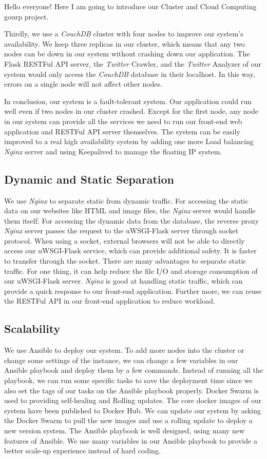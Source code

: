 \documentclass{article}
\begin{document}
Hello everyone! Here I am going to introduce our Cluster and Cloud Computing gourp project.
 

Thirdly, we use a \textit{CouchDB} cluster with four nodes to improve our system's availability. We keep three replicas in our cluster, which means that any two nodes can be down in our system without crashing down our application. The Flask RESTFul API server, the \textit{Twitter} Crawler, and the \textit{Twitter} Analyzer of our system would only access the \textit{CouchDB} database in their localhost. In this way, errors on a single node will not affect other nodes. 

In conclusion, our system is a fault-tolerant system. Our application could run well even if two nodes in our cluster crashed. Except for the first node, any node in our system can provide all the services we need to run our front-end web application and RESTFul API server themselves. The system can be easily improved to a real high availability system by adding one more Load balancing \textit{Nginx} server and using Keepalived to manage the floating IP system.

\subsection{Dynamic and Static Separation}
We use \textit{Nginx} to separate static from dynamic traffic. For accessing the static data on our websites like HTML and image files, the \textit{Nginx} server would handle them itself. For accessing the dynamic data from the database, the reverse proxy \textit{Nginx} server passes the request to the uWSGI-Flask server through socket protocol. When using a socket, external browsers will not be able to directly access our uWSGI-Flask service, which can provide additional safety. It is faster to transfer through the socket. There are many advantages to separate static traffic. For one thing, it can help reduce the file I/O and storage consumption of our uWSGI-Flask server. \textit{Nginx} is good at handling static traffic, which can provide a quick response to our front-end application. Further more, we can reuse the RESTFul API in our front-end application to reduce workload.

\subsection{Scalability}
We use Ansible to deploy our system. To add more nodes into the cluster or change some settings of the instance, we can change a few variables in our Ansible playbook and deploy them by a few commands. Instead of running all the playbook, we can run some specific tasks to save the deployment time since we also set the tags of our tasks on the Ansible playbook properly. Docker Swarm is used to providing self-healing and Rolling updates. The core docker images of our system have been published to Docker Hub. We can update our system by asking the Docker Swarm to pull the new images and use a rolling update to deploy a new version system. The Ansible playbook is well designed, using many new features of Ansible. We use many variables in our Ansible playbook to provide a better scale-up experience instead of hard coding.
\end{document}
